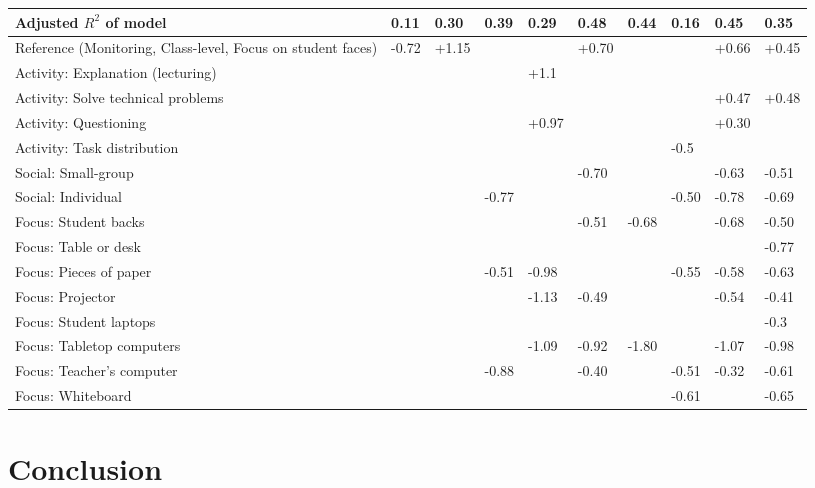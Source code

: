 \documentclass[10pt,journal,compsoc]{IEEEtran}
\begin{document}
\begin{table}[!t]
\begin{tabular}{|p{3cm}||p{1.2cm}|p{1.2cm}|p{1.2cm}|p{1.2cm}|p{1.2cm}|p{1.2cm}|p{1.2cm}|p{1.2cm}|p{1.2cm}|}
  \hline
  Adjusted $R^2$ of model & 0.11 & 0.30 & 0.39 & 0.29 & 0.48 & 0.44 & 0.16 & 0.45 & 0.35 \\ 
  \hline
   \hline
  Reference (Monitoring, Class-level, Focus on student faces) & -0.72 &  +1.15 &     &     &  +0.70 &     &     &  +0.66 &  +0.45 \\ 
   \hline
  Activity: Explanation (lecturing) &   &   &   & +1.1 &   &   &   &   &   \\ 
   \hline
  Activity: Solve technical problems &    &    &    &    &    &    &    & +0.47 & +0.48 \\ 
   \hline
  Activity: Questioning &    &    &    & +0.97 &    &    &    & +0.30 &    \\ 
   \hline
  Activity: Task distribution &    &    &    &    &    &    & -0.5 &    &    \\ 
   \hline
  Social: Small-group &     &     &     &     & -0.70 &     &     & -0.63 & -0.51 \\ 
   \hline
  Social: Individual &     &     & -0.77 &     &     &     & -0.50 & -0.78 & -0.69 \\ 
   \hline
  Focus: Student backs &     &     &     &     & -0.51 & -0.68 &     & -0.68 & -0.50 \\ 
   \hline
  Focus: Table or desk &     &     &     &     &     &     &     &     & -0.77 \\ 
   \hline
  Focus: Pieces of paper &     &     & -0.51 & -0.98 &     &     & -0.55 & -0.58 & -0.63 \\ 
   \hline
  Focus: Projector &     &     &     & -1.13 & -0.49 &     &     & -0.54 & -0.41 \\ 
   \hline
  Focus: Student laptops &    &    &    &    &    &    &    &    & -0.3 \\ 
   \hline
  Focus: Tabletop computers &     &     &     & -1.09 & -0.92 & -1.80 &     & -1.07 & -0.98 \\ 
   \hline
  Focus: Teacher's computer &     &     & -0.88 &     & -0.40 &     & -0.51 & -0.32 & -0.61 \\ 
   \hline
  Focus: Whiteboard &     &     &     &     &     &     & -0.61 &     & -0.65 \\ 
   \hline
\end{tabular}
\end{table}


\section{Conclusion}
\label{sec:conclusion}
\end{document}
